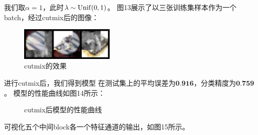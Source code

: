 \documentclass[UTF8]{ctexart}
\begin{document}
我们取$\alpha=1$，此时$\lambda\sim{\rm Unif}(0, 1)$。
图13展示了以三张训练集样本作为一个batch，经过cutmix后的图像：

\begin{figure}[htbp]
    \centering
    \includegraphics[width=0.40\textwidth]{../img/sample_cutmix.png}
    \caption{cutmix的效果}
\end{figure}

进行cutmix后，我们得到模型
在测试集上的平均误差为$\textbf{0.916}$，分类精度为$\textbf{0.759}$。
模型的性能曲线如图14所示：

\begin{figure}[htbp]
    \centering
    \hspace{0.5in}
    \caption{cutmix后模型的性能曲线}
\end{figure}

可视化五个中间block各一个特征通道的输出，如图15所示。
\end{document}
